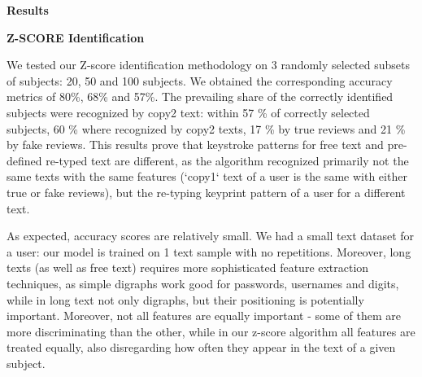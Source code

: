 \documentclass[12pt,a4]{article}
\begin{document}
\bigskip
\large\textbf{Results}
\bigskip

\medskip
\small\textbf{Z-SCORE Identification}
\medskip

\normalsize

We tested our Z-score identification methodology on 3 randomly selected subsets of subjects: 20, 50 and 100 subjects. We obtained the corresponding accuracy metrics of 80\%, 68\% and 57\%. The prevailing share of the correctly identified subjects were recognized by copy2 text: within 57 \% of correctly selected subjects, 60 \% where recognized by copy2 texts, 17 \% by true reviews and 21 \% by fake reviews. This results prove that keystroke patterns for free text and pre-defined re-typed text are different, as the algorithm recognized primarily not the same texts with the same features (`copy1` text of a user is the same with either true or fake reviews), but the re-typing keyprint pattern of a user for a different text.

As expected, accuracy scores are relatively small. We had a small text dataset for a user: our model is trained on 1 text sample with no repetitions. Moreover, long texts (as well as free text) requires more sophisticated feature extraction techniques, as simple digraphs work good for passwords, usernames and digits, while in long text not only digraphs, but their positioning is potentially important. Moreover, not all features are equally important - some of them are more discriminating than the other, while in our z-score algorithm all features are treated equally, also disregarding how often they appear in the text of a given subject.

{}

\end{document}
